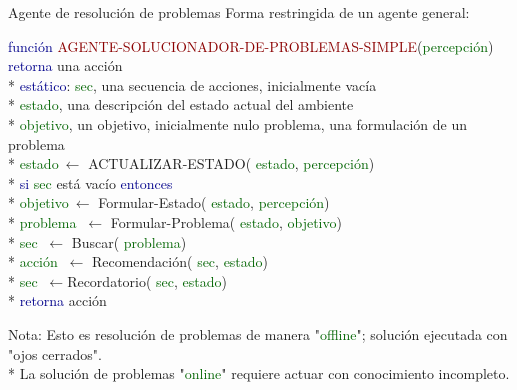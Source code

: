 \documentclass{beamer}
\theoremstyle{definition}
\theoremstyle{theorem}
\theoremstyle{remark}
\begin{document}
\renewcommand{\tablename}{Table}
\renewcommand{\figurename}{\scriptsize Figure}


\begin{frame}
  \titlepage
\end{frame}


\begin{frame}{Agente de resolución de problemas}
Forma restringida de un agente general:

\begin{theorem}[Pseudocódigo]

\begin{listing}
{\scriptsize 
\textcolor{darkblue}{función} \textcolor{darkred}{AGENTE-SOLUCIONADOR-DE-PROBLEMAS-SIMPLE}(\textcolor{darkgreen}{percepción}) 
\textcolor{darkblue}{retorna} una acción
\\* \quad\quad
\textcolor{darkblue}{estático}: 
\textcolor{darkgreen}{sec}, una secuencia de acciones, inicialmente vacía
\\* \quad\quad\quad\quad\quad\quad
\textcolor{darkgreen}{estado}, una descripción del estado actual del ambiente
\\* \quad\quad\quad\quad\quad\quad
\textcolor{darkgreen}{objetivo}, un objetivo, inicialmente nulo
		  problema, una formulación de un problema
\\* \quad\quad
\textcolor{darkgreen}{estado}$\ \leftarrow $ {ACTUALIZAR-ESTADO}(
\textcolor{darkgreen}{estado}, 
\textcolor{darkgreen}{percepción})
\\*\quad\quad
\textcolor{darkblue}{si} 
\textcolor{darkgreen}{sec} está vacío 
\textcolor{darkblue}{entonces} 
\\*\quad\quad\quad\quad
\textcolor{darkgreen}{objetivo}$\ \leftarrow $ Formular-Estado(
\textcolor{darkgreen}{estado}, 
\textcolor{darkgreen}{percepción})
\\*\quad\quad\quad\quad
\textcolor{darkgreen}{problema} $\ \leftarrow $ Formular-Problema(
\textcolor{darkgreen}{estado}, 
\textcolor{darkgreen}{objetivo})\\*
\quad\quad\quad\quad
\textcolor{darkgreen}{sec} $\ \leftarrow $ Buscar(
\textcolor{darkgreen}{problema})\\*
\quad\quad
\textcolor{darkgreen}{acción} $\ \leftarrow $ Recomendación(
\textcolor{darkgreen}{sec}, 
\textcolor{darkgreen}{estado})\\*
\quad\quad
\textcolor{darkgreen}{sec} $\ \leftarrow $Recordatorio(
\textcolor{darkgreen}{sec}, 
\textcolor{darkgreen}{estado})\\*
\quad\quad
\textcolor{darkblue}{retorna} acción
}
\end{listing}

\end{theorem}

{\tiny 
\quad\quad\quad Nota: Esto es resolución de problemas de manera "\textcolor{darkgreen}{offline}"; solución ejecutada con "ojos cerrados".
\\*\quad\quad\quad
La solución de problemas 
"\textcolor{darkgreen}{online}" requiere actuar con conocimiento incompleto.}

\end{frame}
\end{document}
